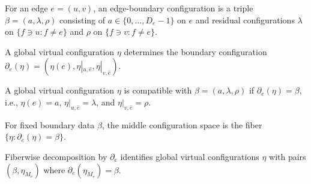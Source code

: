 \begin{definition}%
    \label{def:peps_edgeBoundaryConfig}
    \leanok
    For an edge $e=(u,v)$, an edge-boundary configuration is a triple
    $\beta=(a,\lambda,\rho)$ consisting of $a\in\{0,\ldots,D_e-1\}$ on $e$ and
    residual configurations $\lambda$ on $\{f\ni u:f\ne e\}$ and $\rho$ on
    $\{f\ni v:f\ne e\}$.
\end{definition}

\begin{definition}%
    \label{def:peps_edgeBoundaryOfVirtualConfig}
    \leanok
    A global virtual configuration $\eta$ determines the boundary configuration
    $\partial_e(\eta)=(\eta(e),\eta|_{u,\widehat e},\eta|_{v,\widehat e})$.
\end{definition}

\begin{definition}%
    \label{def:peps_edgeBoundaryMatches}
    \leanok
    A global virtual configuration $\eta$ is compatible with
    $\beta=(a,\lambda,\rho)$ if $\partial_e(\eta)=\beta$, i.e., $\eta(e)=a$,
    $\eta|_{u,\widehat e}=\lambda$, and $\eta|_{v,\widehat e}=\rho$.
\end{definition}

\begin{definition}%
    \label{def:peps_edgeMiddleConfig}
    \leanok
    For fixed boundary data $\beta$, the middle configuration space is the
    fiber $\{\eta:\partial_e(\eta)=\beta\}$.
\end{definition}

\begin{definition}%
    \label{def:peps_virtualConfigEquivEdgeBoundary}
    \leanok
    Fiberwise decomposition by $\partial_e$ identifies global virtual
    configurations $\eta$ with pairs $(\beta,\eta_{M_e})$ where
    $\partial_e(\eta_{M_e})=\beta$.
\end{definition}

